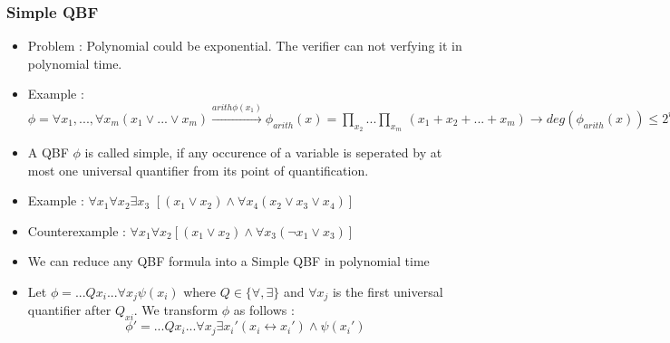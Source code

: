 \documentclass[hyperref={pdfpagelabels=false},t,10pt]{beamer}
\begin{document}
\begin{frame}
  \frametitle{Simple QBF}
\begin{itemize}
  \item Problem : Polynomial could be exponential. The verifier can not verfying it in polynomial time. \pause
  \item Example : $\phi = \forall x_1, ... , \forall x_m (x_1 \lor ... \lor x_m) \xrightarrow{arith \phi(x_1)} \phi_{arith}(x) = \prod_{x_2}^{} ...\prod_{x_m}^{}\, (x_1 +x_2+ ...+ x_m) \rightarrow deg(\phi_{arith}(x)) \leq 2^{m-1}$ \pause
  \item A QBF $\phi$ is called simple, if any occurence of a variable is seperated by at most one universal quantifier from its point of quantification.
  \item Example : $\forall x_1 \forall x_2 \exists x_3$ $[(x_1 \lor x_2) \land \forall x_4 (x_2 \lor x_3 \lor x_4)]$
  \item Counterexample : $\forall x_1 \forall x_2 [(x_1 \lor x_2) \land \forall x_3 (\neg x_1 \lor x_3)]$ \pause
  \item We can reduce any QBF formula into a Simple QBF in polynomial time
  \item Let $\phi = ... Qx_i...\forall x_j \psi(x_i)$ where $Q \in \{\forall, \exists\}$ and $\forall x_j$ is the first universal quantifier after $Q_{xi}$. We transform $\phi$ as follows :
  $$\phi' = ... Qx_i ... \forall x_j\exists x_i' (x_i \leftrightarrow x_i') \land \psi(x_i')$$
\end{itemize}
\end{frame}
\end{document}
